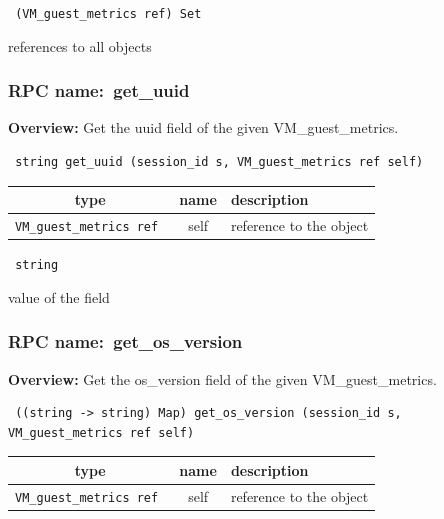 \vspace{0.3cm}

{\tt 
(VM\_guest\_metrics ref) Set
}


references to all objects
\vspace{0.3cm}
\vspace{0.3cm}
\vspace{0.3cm}
\subsubsection{RPC name:~get\_uuid}

{\bf Overview:} 
Get the uuid field of the given VM\_guest\_metrics.

\begin{verbatim} string get_uuid (session_id s, VM_guest_metrics ref self)\end{verbatim}



 
\vspace{0.3cm}
\begin{tabular}{|c|c|p{7cm}|}
 \hline
{\bf type} & {\bf name} & {\bf description} \\ \hline
{\tt VM\_guest\_metrics ref } & self & reference to the object \\ \hline 

\end{tabular}

\vspace{0.3cm}

{\tt 
string
}


value of the field
\vspace{0.3cm}
\vspace{0.3cm}
\vspace{0.3cm}
\subsubsection{RPC name:~get\_os\_version}

{\bf Overview:} 
Get the os\_version field of the given VM\_guest\_metrics.

\begin{verbatim} ((string -> string) Map) get_os_version (session_id s, VM_guest_metrics ref self)\end{verbatim}



 
\vspace{0.3cm}
\begin{tabular}{|c|c|p{7cm}|}
 \hline
{\bf type} & {\bf name} & {\bf description} \\ \hline
{\tt VM\_guest\_metrics ref } & self & reference to the object \\ \hline 

\end{tabular}

